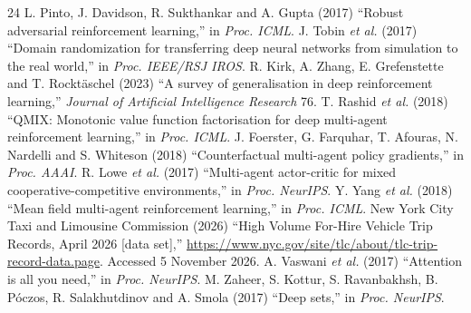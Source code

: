 \documentclass[3p,times,procedia]{elsarticle}
\begin{document}
\begin{thebibliography}{24}
 L. Pinto, J. Davidson, R. Sukthankar and A. Gupta (2017) ``Robust adversarial reinforcement learning,'' in \emph{Proc. ICML}.
 J. Tobin \emph{et al.} (2017) ``Domain randomization for transferring deep neural networks from simulation to the real world,'' in \emph{Proc. IEEE/RSJ IROS}.
 R. Kirk, A. Zhang, E. Grefenstette and T. Rockt\"aschel (2023) ``A survey of generalisation in deep reinforcement learning,'' \emph{Journal of Artificial Intelligence Research} 76.
 T. Rashid \emph{et al.} (2018) ``QMIX: Monotonic value function factorisation for deep multi-agent reinforcement learning,'' in \emph{Proc. ICML}.
 J. Foerster, G. Farquhar, T. Afouras, N. Nardelli and S. Whiteson (2018) ``Counterfactual multi-agent policy gradients,'' in \emph{Proc. AAAI}.
 R. Lowe \emph{et al.} (2017) ``Multi-agent actor-critic for mixed cooperative-competitive environments,'' in \emph{Proc. NeurIPS}.
 Y. Yang \emph{et al.} (2018) ``Mean field multi-agent reinforcement learning,'' in \emph{Proc. ICML}.
 New York City Taxi and Limousine Commission (2026) ``High Volume For-Hire Vehicle Trip Records, April 2026 [data set],'' \url{https://www.nyc.gov/site/tlc/about/tlc-trip-record-data.page}. Accessed 5 November 2026.
 A. Vaswani \emph{et al.} (2017) ``Attention is all you need,'' in \emph{Proc. NeurIPS}.
 M. Zaheer, S. Kottur, S. Ravanbakhsh, B. P\'oczos, R. Salakhutdinov and A. Smola (2017) ``Deep sets,'' in \emph{Proc. NeurIPS}.
\end{thebibliography}
\end{document}
